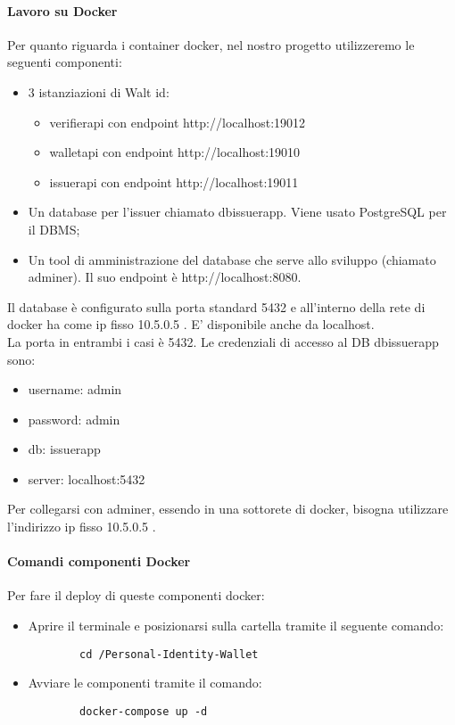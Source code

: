 \paragraph{Lavoro su Docker}
Per quanto riguarda i container docker, nel nostro progetto utilizzeremo le seguenti componenti:
\begin{itemize}
    \item 3 istanziazioni di Walt id:
    \begin{itemize}
        \item verifierapi con endpoint http://localhost:19012
        \item walletapi con endpoint http://localhost:19010
        \item issuerapi con endpoint http://localhost:19011
    \end{itemize}
    \item Un database per l’issuer chiamato dbissuerapp. Viene usato PostgreSQL per il  DBMS;
    \item Un tool di amministrazione del database che serve allo sviluppo (chiamato adminer). Il suo endpoint è http://localhost:8080.
\end{itemize}
Il database è configurato sulla porta standard 5432 e all’interno della rete di docker ha come ip fisso 10.5.0.5 . E' disponibile anche da localhost.\\
La porta in entrambi i casi è 5432.
Le credenziali di accesso al DB dbissuerapp sono:
\begin{itemize}
    \item username: admin
    \item password: admin
    \item db: issuerapp
    \item server: localhost:5432
\end{itemize}
Per collegarsi con adminer, essendo in una sottorete di docker, bisogna utilizzare l'indirizzo ip fisso 10.5.0.5 .
\paragraph{Comandi componenti Docker}
Per fare il deploy di queste componenti docker:
\begin{itemize}
    \item Aprire il terminale e posizionarsi sulla cartella tramite il seguente comando: 
    \begin{verbatim}
        cd /Personal-Identity-Wallet
    \end{verbatim}
    \item Avviare le componenti tramite il comando:
    \begin{verbatim}
        docker-compose up -d
    \end{verbatim}
\end{itemize}


